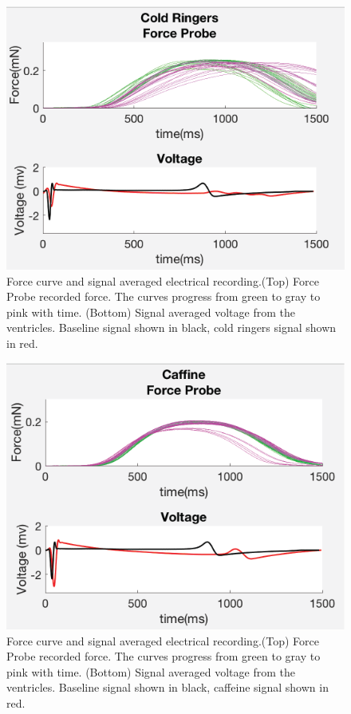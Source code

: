 \documentclass[12pt]{article}
\begin{document}

\begin{figure}[H]
	\label{fig:ColdRinger}
	\centering
	\includegraphics[width = .95\textwidth]{Figures/ColdR.png}
	\caption{Force curve and signal averaged electrical recording.(Top) Force Probe recorded force. The curves progress from green to gray to pink with time. (Bottom) Signal averaged voltage from the ventricles. Baseline signal shown in black, cold ringers signal shown in red. }
\end{figure}

\begin{figure}[H]
	\label{fig:Caffine}
	\centering
	\includegraphics[width = .95\textwidth]{Figures/Caffine.png}
	\caption{Force curve and signal averaged electrical recording.(Top) Force Probe recorded force. The curves progress from green to gray to pink with time. (Bottom) Signal averaged voltage from the ventricles. Baseline signal shown in black, caffeine signal shown in red. }
\end{figure}
\end{document}
